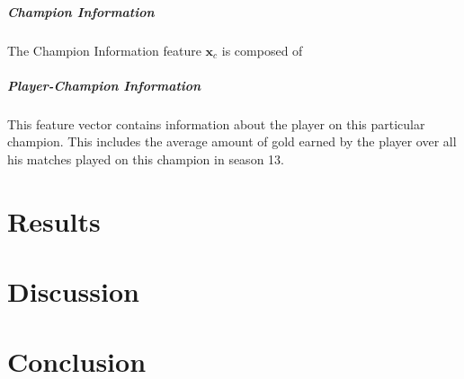 \documentclass[12pt, a4paper, headinclude, twoside, plainheadsepline, open=right, numbers=noenddot, hidelinks, toc=listof, toc=bibliography]{scrreprt}
\begin{document}
\paragraph{Champion Information}
The Champion Information feature $\mathbf{x}_c$ is composed of 

\paragraph{Player-Champion Information}
This feature vector contains information about the player on this particular champion.
This includes the average amount of gold earned by the player over all his matches played on this champion in season 13.




\chapter{Results}
\label{chap:results}


\chapter{Discussion}
\label{chap:discussion}


\chapter{Conclusion}
\label{chap:conclusion}

%
%
%
\printbibliography






\listoffigures																			%
\listoftables																			%
\cleardoublepage{}	%
\printacronyms[heading={chapter*}, name={List of Abbreviations}]
\end{document}
